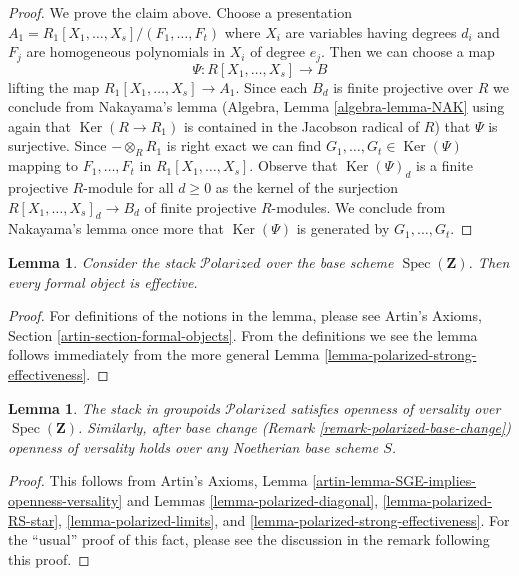 \documentclass{stacks-project}
\theoremstyle{plain}
\newtheorem{lemma}[subsection]{Lemma}
\theoremstyle{definition}
\theoremstyle{remark}
\numberwithin{equation}{subsection}
\def\Spec{\mathop{\mathrm{Spec}}}
\def\Ker{\mathop{\mathrm{Ker}}}
\def\Polarizedstack{\mathcal{P}\!\mathit{olarized}}
\begin{document}
\begin{proof}
\medskip\noindent
We prove the claim above.
Choose a presentation $A_1 = R_1[X_1, \ldots, X_s]/(F_1, \ldots, F_t)$
where $X_i$ are variables having degrees $d_i$ and $F_j$
are homogeneous polynomials in $X_i$ of degree $e_j$.
Then we can choose a map
$$
\Psi : R[X_1, \ldots, X_s] \longrightarrow B
$$
lifting the map $R_1[X_1, \ldots, X_s] \to A_1$. Since each $B_d$
is finite projective over $R$ we conclude from 
Nakayama's lemma (Algebra, Lemma \ref{algebra-lemma-NAK}
using again that $\Ker(R \to R_1)$ is contained in the Jacobson radical
of $R$) that $\Psi$ is surjective. Since $- \otimes_R R_1$ is right
exact we can find $G_1, \ldots, G_t \in \Ker(\Psi)$
mapping to $F_1, \ldots, F_t$ in $R_1[X_1, \ldots, X_s]$.
Observe that $\Ker(\Psi)_d$ is a finite projective $R$-module
for all $d \geq 0$ as the kernel of the surjection
$R[X_1, \ldots, X_s]_d \to B_d$ of finite projective $R$-modules.
We conclude from Nakayama's lemma once more that 
$\Ker(\Psi)$ is generated by $G_1, \ldots, G_t$.
\end{proof}

\begin{lemma}
\label{lemma-polarized-existence}
Consider the stack $\Polarizedstack$ over the base
scheme $\Spec(\mathbf{Z})$. Then every formal object is effective.
\end{lemma}

\begin{proof}
For definitions of the notions in the lemma, please see
Artin's Axioms, Section \ref{artin-section-formal-objects}.
From the definitions we see the lemma follows immediately
from the more general Lemma \ref{lemma-polarized-strong-effectiveness}.
\end{proof}

\begin{lemma}
\label{lemma-polarized-defo-thy}
The stack in groupoids $\Polarizedstack$
satisfies openness of versality over $\Spec(\mathbf{Z})$.
Similarly, after base change (Remark \ref{remark-polarized-base-change})
openness of versality holds over any Noetherian base scheme $S$.
\end{lemma}

\begin{proof}
This follows from
Artin's Axioms, Lemma \ref{artin-lemma-SGE-implies-openness-versality}
and Lemmas \ref{lemma-polarized-diagonal},
\ref{lemma-polarized-RS-star},
\ref{lemma-polarized-limits}, and
\ref{lemma-polarized-strong-effectiveness}.
For the ``usual'' proof of this fact, please see the discussion
in the remark following this proof.
\end{proof}
\end{document}
